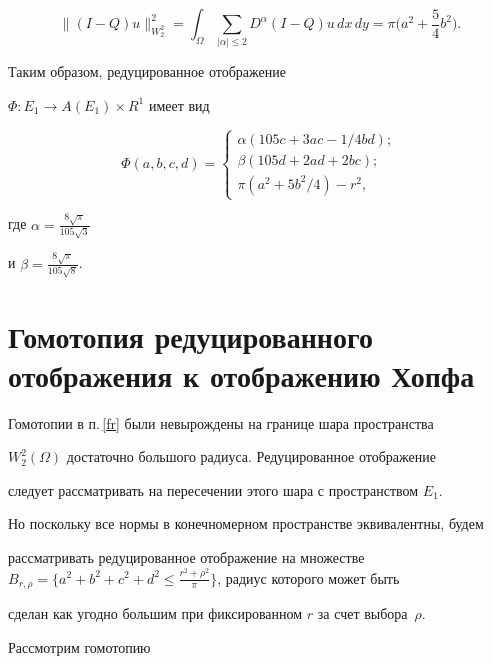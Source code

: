 $$


\|(I-Q)u\|_{W^2_2}^2=\int_{\Omega}\sum_{|\alpha |\le 2}D^{\alpha }


(I-Q)u\, dx\,dy=\pi \bigg(a^2+\frac{5}{4}b^2\bigg).


$$


Таким образом, редуцированное отображение


$\Phi : E_1\to A(E_1)\times R^1$ имеет вид


$$


\Phi (a,b,c,d)=


\begin{cases}


\alpha (105c+3ac-1/4bd);\\


\beta (105d+2ad+2bc);\\


\pi(a^2+5b^2/4)-r^2,


\end{cases}


$$


где $\alpha =\frac{8\sqrt{\pi }}{105\sqrt{3}}$


и $\beta =\frac{8\sqrt{\pi }}{105\sqrt{8}}$.





\section{Гомотопия редуцированного отображения к отображению Хопфа}





Гомотопии в п.\,\ref{fr} были невырождены на границе шара пространства 


$W^2_2(\Omega)$ достаточно большого радиуса. Редуцированное отображение


следует рассматривать на пересечении этого шара с пространством $E_1$. 


Но поскольку все нормы в конечномерном пространстве эквивалентны, будем 


рассматривать редуцированное отображение на множестве $B_{r,\rho}=


\{a^2+b^2+c^2+d^2\le \frac{r^2+\rho^2}{\pi}\}$, радиус которого может быть 


сделан как угодно большим при фиксированном $r$ за счет выбора~$\rho$.





Рассмотрим гомотопию


